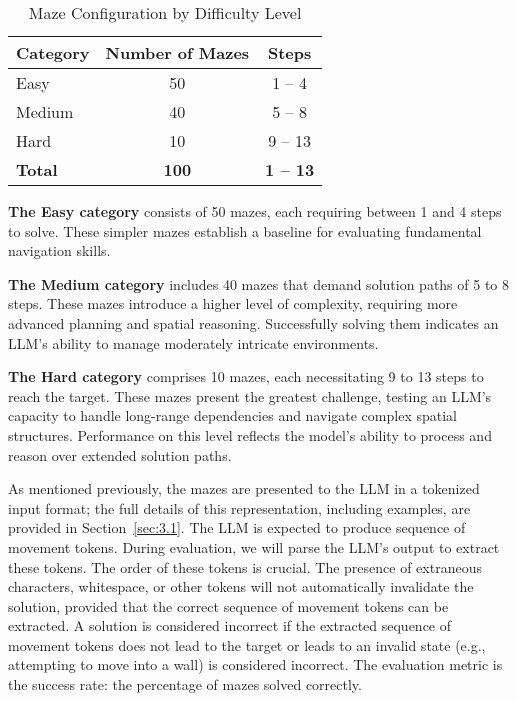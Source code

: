 \begin{table}[htbp]
    \centering
    \caption{Maze Configuration by Difficulty Level}
    \label{tab:maze-config}
    \begin{tabular}{|l|c|c|}
        \hline
        Category & Number of Mazes & Steps \\
        \hline
        Easy   & 50 & 1 -- 4 \\
        Medium & 40 & 5 -- 8 \\
        Hard   & 10 & 9 -- 13 \\
        \hline
        \textbf{Total} & \textbf{100} & \textbf{1 -- 13} \\
        \hline
    \end{tabular}
\end{table}

\textbf{The Easy category} consists of 50 mazes, each requiring between 1 and 4 steps to solve. These simpler mazes establish a baseline for evaluating fundamental navigation skills.

\textbf{The Medium category} includes 40 mazes that demand solution paths of 5 to 8 steps. These mazes introduce a higher level of complexity, requiring more advanced planning and spatial reasoning. Successfully solving them indicates an LLM’s ability to manage moderately intricate environments.

\textbf{The Hard category} comprises 10 mazes, each necessitating 9 to 13 steps to reach the target. These mazes present the greatest challenge, testing an LLM’s capacity to handle long-range dependencies and navigate complex spatial structures. Performance on this level reflects the model’s ability to process and reason over extended solution paths.

As mentioned previously, the mazes are presented to the LLM in a tokenized input format; the full details of this representation, including examples, are provided in Section~\ref{sec:3.1}. The LLM is expected to produce sequence of movement tokens. During evaluation, we will parse the LLM's output to extract these tokens. The order of these tokens is crucial. The presence of extraneous characters, whitespace, or other tokens will not automatically invalidate the solution, provided that the correct sequence of movement tokens can be extracted. A solution is considered incorrect if the extracted sequence of movement tokens does not lead to the target or leads to an invalid state (e.g., attempting to move into a wall) is considered incorrect. The evaluation metric is the success rate: the percentage of mazes solved correctly.

